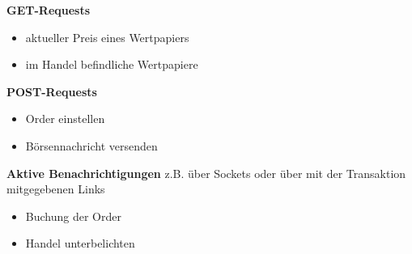 	\textbf{GET-Requests}
		\begin{itemize}
			\item aktueller Preis eines Wertpapiers
			\item im Handel befindliche Wertpapiere
		\end{itemize}
	\textbf{POST-Requests}
		\begin{itemize}
			\item Order einstellen
			\item Börsennachricht versenden
		\end{itemize}
	\textbf{Aktive Benachrichtigungen} z.B. über Sockets oder über mit der Transaktion mitgegebenen Links
		\begin{itemize}
			\item Buchung der Order
			\item Handel unterbelichten
		\end{itemize}